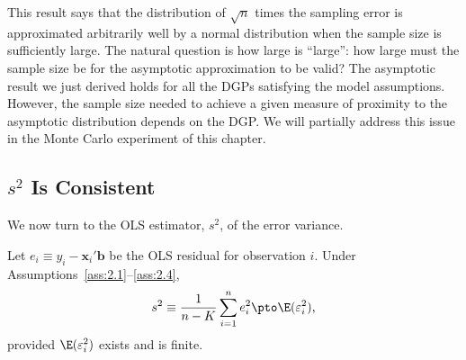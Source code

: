 This result says that the distribution of $\sqrt{n}$ times the sampling error is
approximated arbitrarily well by a normal distribution when the sample size is
sufficiently large.  The natural question is how large is ``large'': how large must
the sample size be for the asymptotic approximation to be valid?  The asymptotic
result we just derived holds for all the DGPs satisfying the model assumptions.
However, the sample size needed to achieve a given measure of proximity to the
asymptotic distribution depends on the DGP.  We will partially address this issue in
the Monte Carlo experiment of this chapter.

\subsection*{$s^2$ Is Consistent}

We now turn to the OLS estimator, $s^2$, of the error variance.

\begin{proposition}
\label{prop:2.2}
Let $e_i \equiv y_i - \mathbf{x}_i'\mathbf{b}$ be the OLS residual for observation
$i$.  Under Assumptions~\ref{ass:2.1}--\ref{ass:2.4},
\[
  s^2 \equiv \frac{1}{n - K} \sum_{i=1}^{n} e_i^2 \pto \E(\varepsilon_i^2),
\]
provided $\E(\varepsilon_i^2)$ exists and is finite.
\end{proposition}

